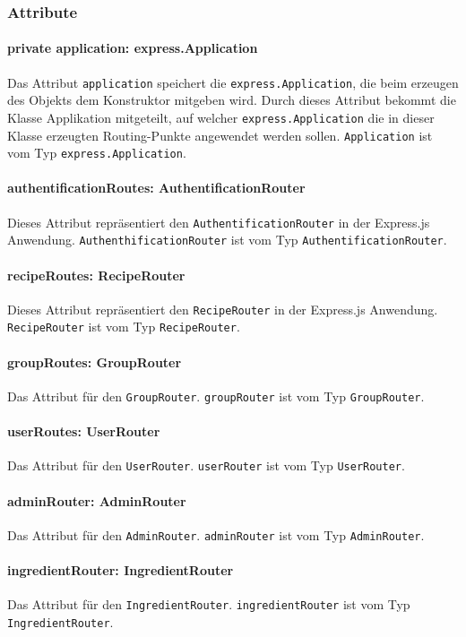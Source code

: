 \documentclass[parskip=full]{scrartcl}
\begin{document}
\subsubsection*{Attribute}
\paragraph{private application: express.Application}Das Attribut \texttt{application} speichert die \newline
\texttt{express.Application}, die beim erzeugen des Objekts dem Konstruktor mitgeben wird.
Durch dieses Attribut bekommt die Klasse Applikation mitgeteilt, auf welcher \texttt{express.Application} die in dieser Klasse erzeugten Routing-Punkte angewendet werden sollen.
\texttt{Application} ist vom Typ \texttt{express.Application}.
\paragraph{authentificationRoutes: AuthentificationRouter}Dieses Attribut repräsentiert den \newline
\texttt{AuthentificationRouter} in der Express.js Anwendung. \texttt{AuthenthificationRouter} ist vom Typ \texttt{AuthentificationRouter}.
\paragraph{recipeRoutes: RecipeRouter}Dieses Attribut repräsentiert den \texttt{RecipeRouter} in der Express.js Anwendung. \texttt{RecipeRouter} ist vom Typ \texttt{RecipeRouter}.
\paragraph{groupRoutes: GroupRouter}Das Attribut für den \texttt{GroupRouter}. \texttt{groupRouter} ist vom \newline
Typ \texttt{GroupRouter}.
\paragraph{userRoutes: UserRouter}Das Attribut für den \texttt{UserRouter}. \texttt{userRouter} ist vom Typ \newline
\texttt{UserRouter}.
\paragraph{adminRouter: AdminRouter}Das Attribut für den \texttt{AdminRouter}. \texttt{adminRouter} ist vom Typ \texttt{AdminRouter}.
\paragraph{ingredientRouter: IngredientRouter}Das Attribut für den \texttt{IngredientRouter}. \newline
\texttt{ingredientRouter} ist vom Typ \texttt{IngredientRouter}.
\end{document}
